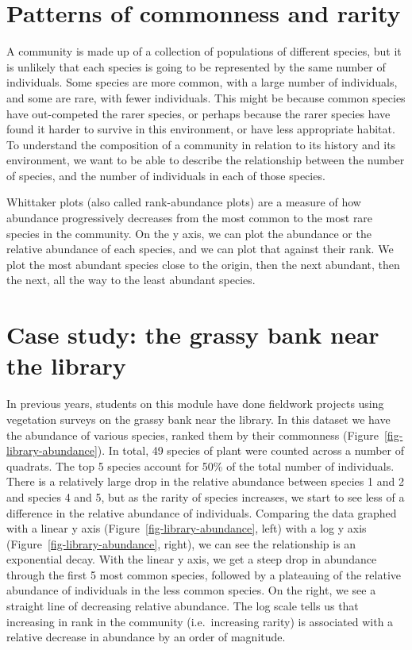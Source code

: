 \documentclass[
  letterpaper,
  DIV=11,
  numbers=noendperiod]{scrreprt}
\begin{document}
\section{Patterns of commonness and
rarity}\label{patterns-of-commonness-and-rarity}

A community is made up of a collection of populations of different
species, but it is unlikely that each species is going to be represented
by the same number of individuals. Some species are more common, with a
large number of individuals, and some are rare, with fewer individuals.
This might be because common species have out-competed the rarer
species, or perhaps because the rarer species have found it harder to
survive in this environment, or have less appropriate habitat. To
understand the composition of a community in relation to its history and
its environment, we want to be able to describe the relationship between
the number of species, and the number of individuals in each of those
species.

Whittaker plots (also called rank-abundance plots) are a measure of how
abundance progressively decreases from the most common to the most rare
species in the community. On the y axis, we can plot the abundance or
the relative abundance of each species, and we can plot that against
their rank. We plot the most abundant species close to the origin, then
the next abundant, then the next, all the way to the least abundant
species.

\section{Case study: the grassy bank near the
library}\label{case-study-the-grassy-bank-near-the-library}

In previous years, students on this module have done fieldwork projects
using vegetation surveys on the grassy bank near the library. In this
dataset we have the abundance of various species, ranked them by their
commonness (Figure~\ref{fig-library-abundance}). In total, 49 species of
plant were counted across a number of quadrats. The top 5 species
account for 50\% of the total number of individuals. There is a
relatively large drop in the relative abundance between species 1 and 2
and species 4 and 5, but as the rarity of species increases, we start to
see less of a difference in the relative abundance of individuals.
Comparing the data graphed with a linear y axis
(Figure~\ref{fig-library-abundance}, left) with a log y axis
(Figure~\ref{fig-library-abundance}, right), we can see the relationship
is an exponential decay. With the linear y axis, we get a steep drop in
abundance through the first 5 most common species, followed by a
plateauing of the relative abundance of individuals in the less common
species. On the right, we see a straight line of decreasing relative
abundance. The log scale tells us that increasing in rank in the
community (i.e.~increasing rarity) is associated with a relative
decrease in abundance by an order of magnitude.
\end{document}
